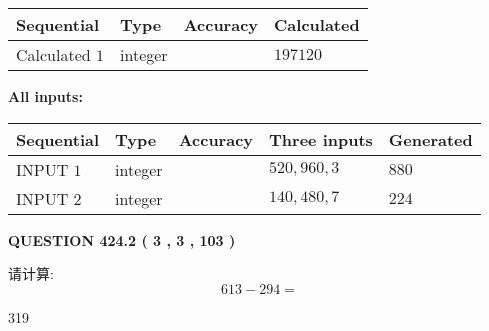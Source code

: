 \documentclass{ctexart}
\begin{document}
   
   
   
\noindent{}
   
   
  
  
\noindent\begin{tabular}{|l|l|l|l|}
\hline
 Sequential & Type & Accuracy & Calculated \\ 
\hline
 
 
  Calculated $  1 $ & integer &  & 
  $ 197120 $ 
 \\  \hline  
 \end{tabular}
   
   
   
   
\noindent\vspace{0.1in}\hspace{-0.08in} {\textbf{\Large{All inputs: }}}
   
   
  
  
\noindent\begin{tabular}{|l|l|l|l|l|}
\hline
 Sequential & Type & Accuracy & Three inputs & Generated \\ 
\hline
 
 
  INPUT $  1 $ & integer &  & $
 520
 , 
 960
 , 
 3
 $ & $ 880 $ 
 \\  \hline  
 
 
  INPUT $  2 $ & integer &  & $
 140
 , 
 480
 , 
 7
 $ & $ 224 $ 
 \\  \hline  
 \end{tabular}
   
   
  
\vspace{0.2in}
  
{\textbf{\Large{QUESTION
424.2 
 ( 3 , 3 , 103 )
}}}
  
  
 
请计算:
\begin{equation}
613 -   %
294 = \nonumber
\end{equation}
 
 
 
\noindent{}
 
 

319
 
 
\noindent{}
 
 

 
 
 
\noindent{}
 
\end{document}
